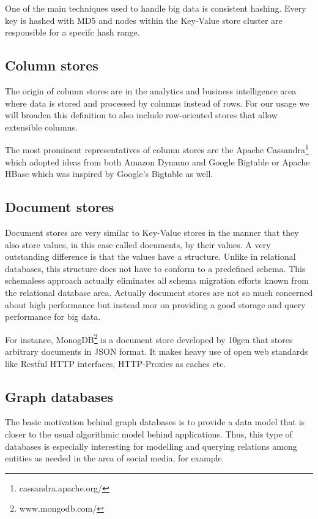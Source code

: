 \documentclass{sig-alternate}
\begin{document}
One of the main techniques used to handle big data is consistent hashing. Every key is hashed with MD5 and nodes within the Key-Value store cluster are responsible for a specifc hash range.\cite{strauch:nosql}

\subsection{Column stores}

The origin of column stores are in the analytics and business intelligence area where data is stored and processed by columns instead of rows. For our usage we will broaden this definition to also include row-oriented stores that allow extensible columns\cite{strauch:nosql}.

The most prominent representatives of column stores are the Apache Cassandra\footnote{cassandra.apache.org/} which adopted ideas from both Amazon Dynamo and Google Bigtable\cite{chang2008bigtable} or Apache HBase which was inspired by Google's Bigtable as well.

\subsection{Document stores}

Document stores are very similar to Key-Value stores in the manner that they also store values, in this case called documents, by their values. A very outstanding difference is that the values have a structure. Unlike in relational databases, this structure does not have to conform to a predefined schema. This schemaless approach actually eliminates all schema migration efforts known from the relational database area.
Actually document stores are not so much concerned about high performance but instead mor on providing a good storage and query performance for big data\cite{clarence:nosql}.

For instance, MonogDB\footnote{www.mongodb.com/} is a document store developed by 10gen that stores arbitrary documents in JSON format. It makes heavy use of open web standards like Restful HTTP interfaces, HTTP-Proxies as caches etc.

\subsection{Graph databases}
The basic motivation behind graph databases is to provide a data model that is closer to the usual algorithmic model behind applications. Thus, this type of databases is especially interesting for modelling and querying relations among entities as needed in the area of social media, for example.
\end{document}
